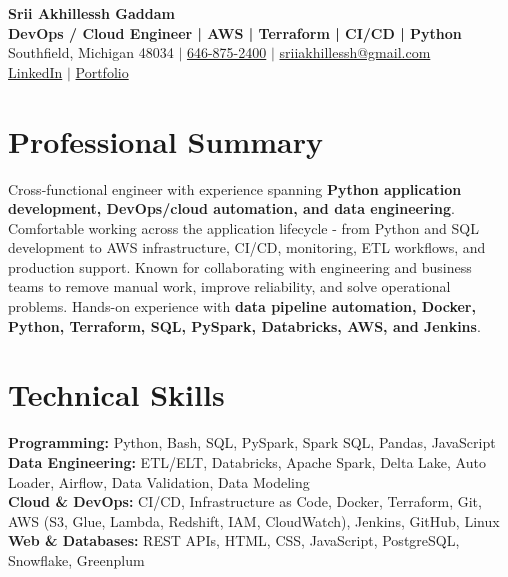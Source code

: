 \documentclass[letterpaper,10pt]{article}
\begin{document}
\fontsize{9.35pt}{10.45pt}\selectfont

\begin{center}
    {\LARGE \textbf{Srii Akhillessh Gaddam}} \\[-1pt]
    \textbf{DevOps / Cloud Engineer | AWS | Terraform | CI/CD | Python} \\[2pt]
    Southfield, Michigan 48034 $|$
    \href{tel:6468752400}{646-875-2400} $|$
    \href{mailto:sriiakhillessh@gmail.com}{sriiakhillessh@gmail.com} \\[1pt]
    \href{https://www.linkedin.com/in/srii-akhiilessh-gaddam-b48668191/}{LinkedIn} $|$
    \href{https://sriiakhillesshg.github.io/portfolio/}{Portfolio}
\end{center}
\vspace{-8pt}

\section{Professional Summary}
\small{Cross-functional engineer with experience spanning \textbf{Python application development, DevOps/cloud automation, and data engineering}. Comfortable working across the application lifecycle - from Python and SQL development to AWS infrastructure, CI/CD, monitoring, ETL workflows, and production support. Known for collaborating with engineering and business teams to remove manual work, improve reliability, and solve operational problems. Hands-on experience with \textbf{data pipeline automation, Docker, Python, Terraform, SQL, PySpark, Databricks, AWS, and Jenkins}.}

\section{Technical Skills}
\small{
\textbf{Programming:} Python, Bash, SQL, PySpark, Spark SQL, Pandas, JavaScript \\
\textbf{Data Engineering:} ETL/ELT, Databricks, Apache Spark, Delta Lake, Auto Loader, Airflow, Data Validation, Data Modeling \\
\textbf{Cloud \& DevOps:} CI/CD, Infrastructure as Code, Docker, Terraform, Git, AWS (S3, Glue, Lambda, Redshift, IAM, CloudWatch), Jenkins, GitHub, Linux \\
\textbf{Web \& Databases:} REST APIs, HTML, CSS, JavaScript, PostgreSQL, Snowflake, Greenplum
}
\end{document}
